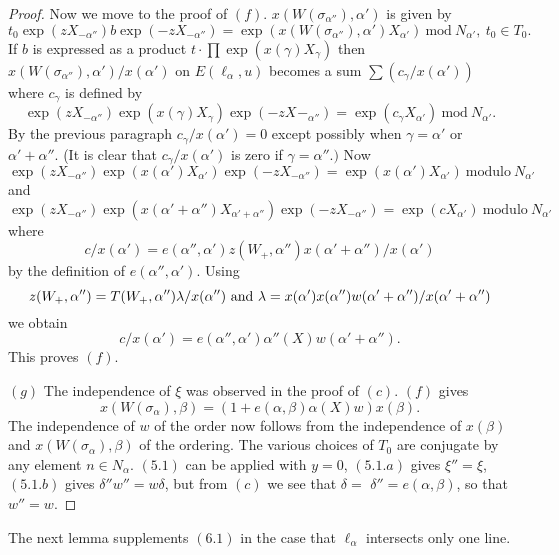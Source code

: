 \documentclass{memo-l}
\theoremstyle{definition}
\theoremstyle{remark}
\numberwithin{section}{chapter}
\numberwithin{equation}{chapter}
\begin{document}
\begin{proof}
   Now we move to the proof of $(f)$.
$x(W({\sigma}_{{\alpha}''}),{\alpha}')$ is given by
$$
t_{0}\exp(zX_{-\alpha''})b\exp(-zX_{-{\alpha}''})  = 
\exp(x(W({\sigma}_{{\alpha}''}),{\alpha}')X_{{\alpha'}})\ 
{\text{mod}}\ N_{{\alpha}'},\ t_{0}  \in  T_{0}.
$$
If $b$ is expressed as a product $t \cdot \prod\exp(x({\gamma})X_{{\gamma}})$ then
$x(W({\sigma}_{{\alpha}''}),{\alpha}')/x({\alpha}')$ on
$E({\ell}_{{\alpha}},u)$ becomes a sum $\sum
(c_{{\gamma}}/x({\alpha}'))$ where $c_{{\gamma}}$ is defined by
$$
\exp(zX_{-{\alpha}''})\exp(x({\gamma})X_{{\gamma}})\exp(-zX_{}-_{{\alpha}''})  = 
\exp(c_{{\gamma}}X_{{\alpha}'})\ {\text{mod}}\  N_{{\alpha}'} .
$$
By the previous paragraph $c_{{\gamma}}/x({\alpha}') = 0$ except possibly
when ${\gamma}  =  {\alpha}'$ or ${\alpha}'+{\alpha}''$.  (It is clear that
$c_{{\gamma}}/x({\alpha}')$ is zero if ${\gamma} = {\alpha}''.)$ Now
$$
\exp(zX_{-{\alpha}''})\exp(x({\alpha}')X_{{\alpha}'})\exp(-zX_{-{\alpha}''})  = 
\exp(x({\alpha}')X_{{\alpha}'})\ {\text{modulo}}\ N_{{\alpha'}}
$$
and
$$
\exp(zX_{-{\alpha}''})\exp(x({\alpha}'+{\alpha}'')X_{{\alpha}'+{\alpha}''})
\exp(-zX_{-{\alpha}''}) = \exp(cX_{{\alpha}'})\ {\text{modulo}}\ N_{{\alpha'}}
$$ 
where $$c/x({\alpha}')  = 
e({\alpha}'',{\alpha}')z(W_{+},{\alpha}'')x({\alpha}'+{\alpha}'')/x({\alpha}')$$
by the definition of $e({\alpha}'',{\alpha}')$.  Using
$$z(W_{+},{\alpha}'') = T(W_{+},{\alpha}''){\lambda}/x({\alpha}'')\
\hbox {and} \ {\lambda}  = 
x({\alpha}')x({\alpha}'')w({\alpha}'+{\alpha}'')/x({\alpha}'+{\alpha}'')$$ we
obtain $$c/x({\alpha}')  = 
e({\alpha}'',{\alpha}'){\alpha}''(X)w({\alpha}'+{\alpha}'').$$  This proves $(f)$.

   
$(g)$ The independence of ${\xi}$ was observed in the proof of $(c)$.
$(f)$ gives $$x(W({\sigma}_{{\alpha}}),{\beta})  = 
(1+e({\alpha},{\beta}){\alpha}(X)w)x({\beta}).$$  The independence of $w$ of
the order now follows from the independence of $x({\beta})$ and
$x(W({\sigma}_{{\alpha}}),{\beta})$ of the ordering.  The various choices
of $T_{0}$ are conjugate by any element $n  \in  N_{{\alpha}}$.  $(5.1)$
can be applied with $y  =  0$, $(5.1.a)$ gives ${\xi''}  =  {\xi}$, $(5.1.b)$ gives
${\delta''}w''  =  w{\delta}$, but from $(c)$ we see that ${\delta}  =$  ${\delta}''  = 
e({\alpha},{\beta})$, so that $w''  =  w$.
\end{proof} 

{\medskip}

The next lemma supplements $(6.1)$ in the case that
${\ell}_{{\alpha}}$ intersects only one line.

\medskip
\end{document}
